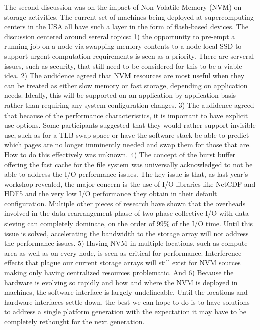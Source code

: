 \documentclass{llncs}
\begin{document}
The second discussion was on the impact of Non-Volatile Memory (NVM) on storage
activities. The current set of machines being deployed at supercomputing
centers in the USA all have such a layer in the form of flash-based devices.
The discussion centered around sereral topics: 1) the opportunity to pre-empt a
running job on a node via swapping memory contents to a node local SSD to
support urgent computation requirements is seen as a priority. There are
serveral issues, such as security, that still need to be considered for this to
be a viable idea. 2) The audidence agreed that NVM resources are most useful
when they can be treated as either slow memory or fast storage, depending on
application needs. Ideally, this will be supported on an
application-by-application basis rather than requiring any system configuration
changes. 3) The audidence agreed that because of the performance
characteristics, it is important to have explicit use options. Some
participants suggested that they would rather support invisible use, such as
for a TLB swap space or have the software stack be able to predict which pages
are no longer imminently needed and swap them for those that are. How to do
this effectively was unknown. 4) The concept of the burst buffer offering the
fast cache for the file system was universally acknowledged to not be able to
address the I/O performance issues. The key issue is that, as last year's
workshop revealed, the major concern is the use of I/O libraries like NetCDF
and HDF5 and the very low I/O performance they obtain in their default
configuration. Multiple other pieces of research have shown that the overheads
involved in the data rearrangement phase of two-phase collective I/O with data
sieving can completely dominate, on the order of 99\% of the I/O time. Until
this issue is solved, accelerating the bandwidth to the storage array will not
address the performance issues. 5) Having NVM in multiple locations, such as
compute area as well as on every node, is seen as critical for performance.
Interference effects that plague our current storage arrays will still exist
for NVM sources making only having centralized resources problematic. And 6)
Because the hardware is evolving so rapidly and how and where the NVM is
deployed in machines, the software interface is largely undefineable. Until the
locations and hardware interfaces settle down, the best we can hope to do is to
have solutions to address a single platform generation with the expectation it
may have to be completely rethought for the next generation.




\end{document}
